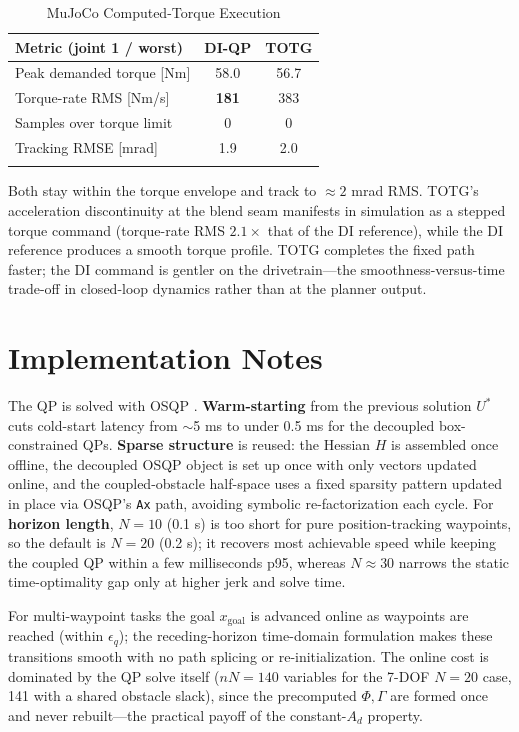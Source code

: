 {%
\begin{table}[t]
\caption{MuJoCo Computed-Torque Execution}
\label{tab:mujoco-execution}
\centering
\footnotesize
\setlength{\tabcolsep}{3pt}
\begin{tabular}{@{}lcc@{}}
\toprule\noalign{}
Metric (joint 1 / worst) & DI-QP & TOTG \\
\midrule\noalign{}
Peak demanded torque {[}Nm{]} & 58.0 & 56.7 \\
Torque-rate RMS {[}Nm/s{]} & \textbf{181} & 383 \\
Samples over torque limit & 0 & 0 \\
Tracking RMSE {[}mrad{]} & 1.9 & 2.0 \\
\bottomrule\noalign{}
\end{tabular}
\end{table}
}

Both stay within the torque envelope and track to \(\approx 2\) mrad RMS.
TOTG's acceleration discontinuity at the blend seam manifests in simulation as
a stepped torque command (torque-rate RMS \(2.1\times\) that of the DI
reference), while the DI reference produces a smooth torque profile. TOTG
completes the fixed path faster; the DI command is gentler on the
drivetrain---the smoothness-versus-time trade-off in closed-loop dynamics
rather than at the planner output.

\section{Implementation Notes}\label{vii.-implementation-notes}

The QP is solved with OSQP \cite{osqp}. \textbf{Warm-starting} from the
previous solution \(U^*\) cuts cold-start latency from $\sim$5 ms to under
0.5 ms for the decoupled box-constrained QPs. \textbf{Sparse structure} is
reused: the Hessian \(H\) is assembled once offline, the decoupled OSQP
object is set up once with only vectors updated online, and the
coupled-obstacle half-space uses a fixed sparsity pattern updated in place
via OSQP's \texttt{Ax} path, avoiding symbolic re-factorization each cycle.
For \textbf{horizon length}, \(N = 10\) (0.1 s) is too short for pure
position-tracking waypoints, so the default is \(N = 20\) (0.2 s); it
recovers most achievable speed while keeping the coupled QP within a few
milliseconds p95, whereas \(N \approx 30\) narrows the static
time-optimality gap only at higher jerk and solve time.

For multi-waypoint tasks the goal \(x_{\text{goal}}\) is advanced online as
waypoints are reached (within \(\epsilon_q\)); the receding-horizon
time-domain formulation makes these transitions smooth with no path
splicing or re-initialization. The online cost is dominated by the QP solve
itself (\(nN=140\) variables for the 7-DOF \(N{=}20\) case, 141 with a
shared obstacle slack), since the precomputed \(\Phi,\Gamma\) are formed
once and never rebuilt---the practical payoff of the constant-\(A_d\)
property.

